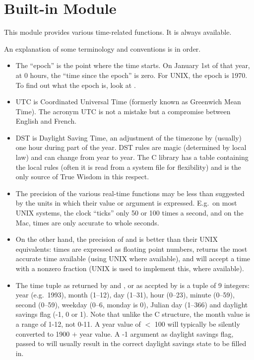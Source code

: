 \section{Built-in Module }

This module provides various time-related functions.
It is always available.

An explanation of some terminology and conventions is in order.

\begin{itemize}

\item
The ``epoch'' is the point where the time starts.  On January 1st of that
year, at 0 hours, the ``time since the epoch'' is zero.  For UNIX, the
epoch is 1970.  To find out what the epoch is, look at .

\item
UTC is Coordinated Universal Time (formerly known as Greenwich Mean
Time).  The acronym UTC is not a mistake but a compromise between
English and French.

\item
DST is Daylight Saving Time, an adjustment of the timezone by
(usually) one hour during part of the year.  DST rules are magic
(determined by local law) and can change from year to year.  The C
library has a table containing the local rules (often it is read from
a system file for flexibility) and is the only source of True Wisdom
in this respect.

\item
The precision of the various real-time functions may be less than
suggested by the units in which their value or argument is expressed.
E.g.\ on most UNIX systems, the clock ``ticks'' only 50 or 100 times a
second, and on the Mac, times are only accurate to whole seconds.

\item
On the other hand, the precision of  and 
is better than their UNIX equivalents: times are expressed as floating
point numbers,  returns the most accurate time available
(using UNIX  where available), and 
will accept a time with a nonzero fraction (UNIX  is
used to implement this, where available).

\item
The time tuple as returned by  and ,
or as accpted by  is a tuple of 9
integers: year (e.g.\ 1993), month (1--12), day (1--31), hour
(0--23), minute (0--59), second (0--59), weekday (0--6, monday is 0),
Julian day (1--366) and daylight savings flag (-1, 0  or 1).
Note that unlike the C structure, the month value is a range of 1-12, not
0-11.  A year value of $<$ 100 will typically be silently converted to
1900 $+$ year value.  A -1 argument as daylight savings flag, passed to
 will usually result in the correct daylight savings
state to be filled in.


\end{itemize}


